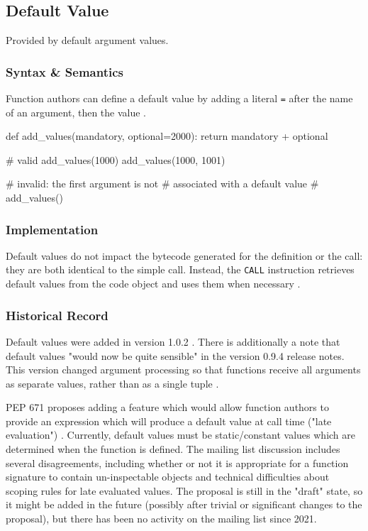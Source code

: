 \subsection{Default Value}
Provided by default argument values.

\subsubsection{Syntax \& Semantics}
Function authors can define a default value by adding a literal \texttt{=} after the name
of an argument, then the value
\parencite[][reference/compound\_stmts.html section 8.7 "Function Definitions"]{python-doc-html}.

\begin{pygmented}[lang=python]
def add_values(mandatory, optional=2000):
    return mandatory + optional

# valid
add_values(1000)
add_values(1000, 1001)

# invalid: the first argument is not
# associated with a default value
# add_values()
\end{pygmented}

\subsubsection{Implementation}
Default values do not impact the bytecode generated for the definition or the call: they
are both identical to the simple call.
Instead, the \texttt{CALL} instruction retrieves default values from the code object
and uses them when necessary
\parencite[][Python/ceval.c lines 1314-1536, trace\_call\_TO\_initialize\_locals]{python-source}.

\subsubsection{Historical Record}
Default values were added in version 1.0.2
\parencite[][Misc/HISTORY lines 32809-32811]{python-source}.
There is additionally a note that default values "would now be quite sensible" in the
version 0.9.4 release notes.
This version changed argument processing so that functions receive all arguments as
separate values, rather than as a single tuple
\parencite[][Misc/HISTORY lines 34550-34639]{python-source}.

PEP 671 proposes adding a feature which would allow function authors to provide an
expression which will produce a default value at call time ("late evaluation")
\parencite[][peps/pep-0671.rst]{python-peps}.
Currently, default values must be static/constant values which are determined when the
function is defined.
The mailing list discussion includes several disagreements, including whether or not it is
appropriate for a function signature to contain un-inspectable objects and technical
difficulties about scoping rules for late evaluated values.
The proposal is still in the "draft" state, so it might be added in the future (possibly
after trivial or significant changes to the proposal), but there has been no activity on
the mailing list since 2021.
\parencite[][]{python-pep-671-mail-discussion}

